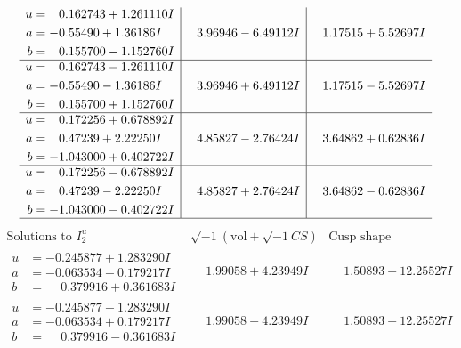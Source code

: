 \documentclass[1p]{elsarticle_modified}
\theoremstyle{definition}
\newcommand{\I}{\sqrt{-1}}
\begin{document}
$$\begin{array}{c|c|c}
\begin{aligned}
u &= \phantom{-}0.162743 + 1.261110 I \\
a &= -0.55490 + 1.36186 I \\
b &= \phantom{-}0.155700 - 1.152760 I\end{aligned}
 & \phantom{-}3.96946 - 6.49112 I & \phantom{-}1.17515 + 5.52697 I \\ \hline\begin{aligned}
u &= \phantom{-}0.162743 - 1.261110 I \\
a &= -0.55490 - 1.36186 I \\
b &= \phantom{-}0.155700 + 1.152760 I\end{aligned}
 & \phantom{-}3.96946 + 6.49112 I & \phantom{-}1.17515 - 5.52697 I \\ \hline\begin{aligned}
u &= \phantom{-}0.172256 + 0.678892 I \\
a &= \phantom{-}0.47239 + 2.22250 I \\
b &= -1.043000 + 0.402722 I\end{aligned}
 & \phantom{-}4.85827 - 2.76424 I & \phantom{-}3.64862 + 0.62836 I \\ \hline\begin{aligned}
u &= \phantom{-}0.172256 - 0.678892 I \\
a &= \phantom{-}0.47239 - 2.22250 I \\
b &= -1.043000 - 0.402722 I\end{aligned}
 & \phantom{-}4.85827 + 2.76424 I & \phantom{-}3.64862 - 0.62836 I\\
 \hline 
 \end{array}$$\newpage$$\begin{array}{c|c|c}  
\text{Solutions to }I^u_{2}& \I (\text{vol} + \sqrt{-1}CS) & \text{Cusp shape}\\
 \hline 
\begin{aligned}
u &= -0.245877 + 1.283290 I \\
a &= -0.063534 - 0.179217 I \\
b &= \phantom{-}0.379916 + 0.361683 I\end{aligned}
 & \phantom{-}1.99058 + 4.23949 I & \phantom{-}1.50893 - 12.25527 I \\ \hline\begin{aligned}
u &= -0.245877 - 1.283290 I \\
a &= -0.063534 + 0.179217 I \\
b &= \phantom{-}0.379916 - 0.361683 I\end{aligned}
 & \phantom{-}1.99058 - 4.23949 I & \phantom{-}1.50893 + 12.25527 I \\ \hline\begin{aligned}

\end{aligned}
\end{array}$$
\end{document}
